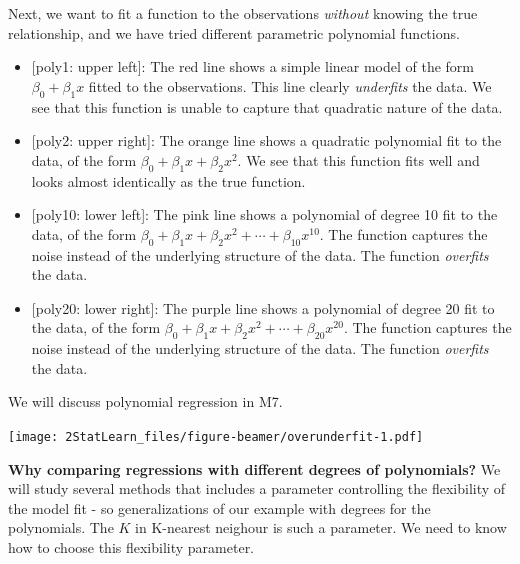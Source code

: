 \documentclass[ignorenonframetext,]{beamer}
\providecommand{\tightlist}{%
  \setlength{\itemsep}{0pt}\setlength{\parskip}{0pt}}
\begin{document}
\begin{frame}

Next, we want to fit a function to the observations \emph{without}
knowing the true relationship, and we have tried different parametric
polynomial functions.

\begin{itemize}
\tightlist
\item
  {{[}poly1: upper left{]}}: The {red} line shows a simple linear model
  of the form \(\beta_0+\beta_1 x\) fitted to the observations. This
  line clearly \emph{underfits} the data. We see that this function is
  unable to capture that quadratic nature of the data.
\item
  {{[}poly2: upper right{]}}: The {orange} line shows a quadratic
  polynomial fit to the data, of the form
  \(\beta_0+\beta_1 x +\beta_2 x^2\). We see that this function fits
  well and looks almost identically as the true function.
\item
  {{[}poly10: lower left{]}}: The {pink} line shows a polynomial of
  degree 10 fit to the data, of the form
  \(\beta_0+\beta_1 x +\beta_2 x^2+\cdots +\beta_{10}x^{10}\). The
  function captures the noise instead of the underlying structure of the
  data. The function \emph{overfits} the data.
\item
  {{[}poly20: lower right{]}}: The {purple} line shows a polynomial of
  degree 20 fit to the data, of the form
  \(\beta_0+\beta_1 x +\beta_2 x^2+\cdots +\beta_{20}x^{20}\). The
  function captures the noise instead of the underlying structure of the
  data. The function \emph{overfits} the data.
\end{itemize}

We will discuss polynomial regression in M7.

\end{frame}

\begin{frame}

\texttt{[image: 2StatLearn\_files/figure-beamer/overunderfit-1.pdf]}

\end{frame}

\begin{frame}

\textbf{Why comparing regressions with different degrees of
polynomials?} We will study several methods that includes a parameter
controlling the flexibility of the model fit - so generalizations of our
example with degrees for the polynomials. The \(K\) in K-nearest
neighour is such a parameter. We need to know how to choose this
flexibility parameter.

\end{frame}
\end{document}

